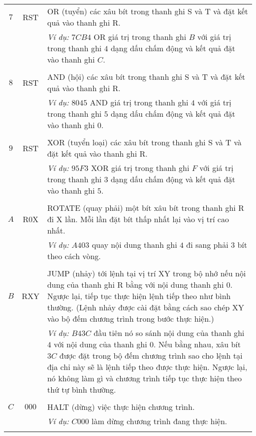 \begin{longtable}{ccm{10cm}}
  $7$ & RST & OR (tuyển) các xâu bít trong thanh ghi S và T và đặt kết
  quả vào
  thanh ghi R. \\
  & & \textit{Ví dụ:} $7CB4$ OR giá trị trong thanh ghi $B$ với giá
  trị trong thanh ghi
  $4$ dạng dấu chấm động và kết quả đặt vào thanh ghi $C$. \\ \\

  $8$ & RST & AND (hội) các xâu bít trong thanh ghi S và T và đặt kết
  quả vào
  thanh ghi R. \\
  & & \textit{Ví dụ:} $8045$ AND giá trị trong thanh ghi $4$ với giá
  trị trong thanh ghi
  $5$ dạng dấu chấm động và kết quả đặt vào thanh ghi $0$. \\ \\

  $9$ & RST & XOR (tuyển loại) các xâu bít trong thanh ghi S và T và
  đặt kết quả vào
  thanh ghi R. \\
  & & \textit{Ví dụ:} $95F3$ XOR giá trị trong thanh ghi $F$ với giá
  trị trong thanh ghi
  $3$ dạng dấu chấm động và kết quả đặt vào thanh ghi $5$. \\ \\

  $A$ & R0X & ROTATE (quay phải) một bít xâu bít trong thanh ghi R đi
  X lần. Mỗi lần đặt
  bít thấp nhất lại vào vị trí cao nhất.\\
  & & \textit{Ví dụ:} $A403$ quay nội dung thanh ghi $4$ đi sang phải
  $3$ bít theo cách
  vòng. \\ \\

  $B$ & RXY & JUMP (nhảy) tới lệnh tại vị trí XY trong bộ nhớ nếu nội
  dung của thanh ghi R bằng với nội dung thanh ghi $0$. Ngược lại,
  tiếp tục thực hiện lệnh tiếp theo như bình thường. (Lệnh nhảy được
  cài đặt bằng cách sao chép XY vào bộ đếm chương trình trong
  bước thực hiện.) \\
  & & \textit{Ví dụ:} $B43C$ đầu tiên nó so sánh nội dung của thanh
  ghi $4$ với nội dung của thanh ghi $0$. Nếu bằng nhau, xâu bít $3C$
  được đặt trong bộ đếm chương trình sao cho lệnh tại địa chỉ này sẽ
  là lệnh tiếp theo được thực hiện. Ngược lại, nó không làm gì
  và chương trình tiếp tục thực hiện theo thứ tự bình thường. \\ \\

  $C$ & $000$ & HALT (dừng) việc thực hiện chương trình.\\
  & & \textit{Ví dụ:} $C000$  làm dừng chương trình đang thực hiện. \\ \\
\end{longtable}
    

